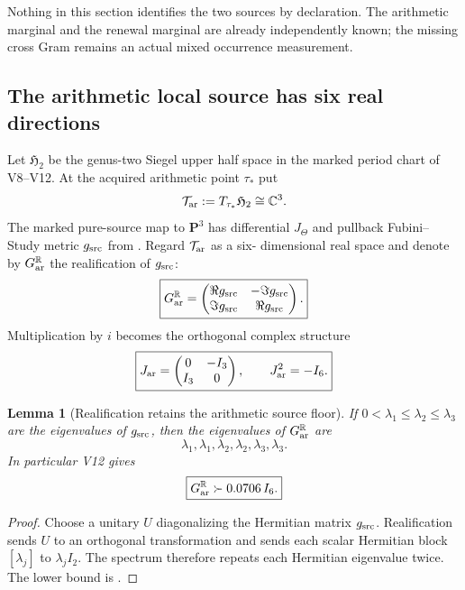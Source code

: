 \documentclass[11pt]{article}
\newtheorem{lemma}[lemma]{Lemma}
\theoremstyle{definition}
\theoremstyle{remark}
\newcommand{\C}{\mathbb C}
\newcommand{\R}{\mathbb R}
\begin{document}
Nothing in this section identifies the two sources by declaration.  The
arithmetic marginal and the renewal marginal are already independently known;
the missing cross Gram remains an actual mixed occurrence measurement.

\subsection{The arithmetic local source has six real directions}
Let $\mathfrak H_2$ be the genus-two Siegel upper half space in the marked
period chart of V8--V12.  At the acquired arithmetic point $\tau_*$ put
\[
 \mathcal T_{\rm ar}:=T_{\tau_*}\mathfrak H_2\cong\C^3.
\]
The marked pure-source map to $\mathbf P^3$ has differential $J_\Theta$ and
pullback Fubini--Study metric $g_{\rm src}$ from
.  Regard $\mathcal T_{\rm ar}$ as a six-
dimensional real space and denote by $G_{\rm ar}^{\R}$ the realification of
$g_{\rm src}$:
\begin{equation}
 \boxed{
 G_{\rm ar}^{\R}
 =\begin{pmatrix}
    \Re g_{\rm src}&-\Im g_{\rm src}\\
    \Im g_{\rm src}& \Re g_{\rm src}
   \end{pmatrix}.}
 \label{eq:v14-realification}
\end{equation}
Multiplication by $i$ becomes the orthogonal complex structure
\begin{equation}
 \boxed{
 J_{\rm ar}=\begin{pmatrix}0&-I_3\\ I_3&0\end{pmatrix},
 \qquad J_{\rm ar}^2=-I_6.}
 \label{eq:v14-Jar}
\end{equation}

\begin{lemma}[Realification retains the arithmetic source floor]
\label{lem:v14-realification-spectrum}
If $0<\lambda_1\le\lambda_2\le\lambda_3$ are the eigenvalues of
$g_{\rm src}$, then the eigenvalues of $G_{\rm ar}^{\R}$ are
\[
 \lambda_1,\lambda_1,\lambda_2,\lambda_2,\lambda_3,\lambda_3.
\]
In particular V12 gives
\begin{equation}
 \boxed{G_{\rm ar}^{\R}\succ0.0706\,I_6.}
 \label{eq:v14-real-floor}
\end{equation}
\end{lemma}

\begin{proof}
Choose a unitary $U$ diagonalizing the Hermitian matrix $g_{\rm src}$.
Realification sends $U$ to an orthogonal transformation and sends each scalar
Hermitian block $[\lambda_j]$ to $\lambda_j I_2$.  The spectrum therefore
repeats each Hermitian eigenvalue twice.  The lower bound is
.
\end{proof}
\end{document}
